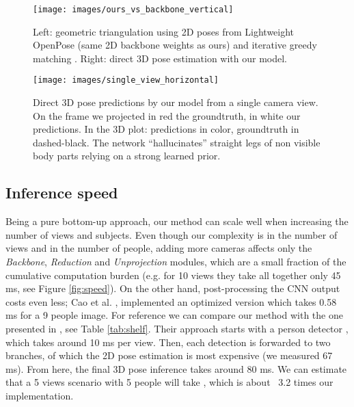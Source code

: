 \documentclass[a4paper,conference]{IEEEtran}
\begin{document}
\begin{figure}[!t]
\texttt{[image: images/ours\_vs\_backbone\_vertical]}
\caption{Left: geometric triangulation using 2D poses from Lightweight OpenPose \cite{osokin2018lightweight_openpose} (same 2D backbone weights as ours) and iterative greedy matching \cite{tanke2019iterative}. Right: direct 3D pose estimation with our model.}
\label{fig:ours_vs_backbone}
\end{figure}
\begin{figure}[!t]
\centering
\texttt{[image: images/single\_view\_horizontal]}
\caption{Direct 3D pose predictions by our model from a single camera view. On the frame we projected in red the groundtruth, in white our predictions. In the 3D plot: predictions in color, groundtruth in dashed-black. The network ``hallucinates'' straight legs of non visible body parts relying on a strong learned prior.}
\label{fig:single_view}
\end{figure}

\subsection{Inference speed}\label{sec:speed}
Being a pure bottom-up approach, our method can scale well when increasing the number of views and subjects. Even though our complexity is  in the number of views and  in the number of people, adding more cameras affects only the \textit{Backbone}, \textit{Reduction} and \textit{Unprojection} modules, which are a small fraction of the cumulative computation burden (e.g. for 10 views they take all together only 45 ms, see Figure \ref{fig:speed}). On the other hand, post-processing the CNN output costs even less; Cao et al. \cite{cao2017realtime}, implemented an optimized version which takes 0.58 ms for a 9 people image. For reference we can compare our method with the one presented in \cite{dong2019fast}, see Table \ref{tab:shelf}. Their approach starts with a person detector \cite{li2017light}, which takes around 10 ms per view. Then, each detection is forwarded to two branches, of which the 2D pose estimation \cite{chen2018cascaded} is most expensive (we measured 67 ms). From here, the final 3D pose inference takes around 80 ms. We can estimate that a 5 views scenario with 5 people will take , which is about ~3.2 times our implementation.
\end{document}
